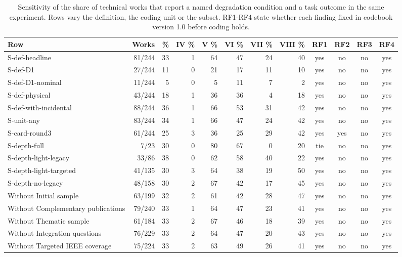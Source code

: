 \begin{table}[!t]
\centering
\caption{Sensitivity of the share of technical works that report a named degradation condition and a task outcome in the same experiment. Rows vary the definition, the coding unit or the subset. RF1-RF4 state whether each finding fixed in codebook version 1.0 before coding holds.}
\label{tab:sensitivity}
\surveytableformat
\setlength{\tabcolsep}{2.6pt}
\begin{tabularx}{\linewidth}{@{}Yrrrrrrrcccc@{}}
\toprule
\textbf{Row} & \textbf{Works} & \textbf{\%} & \textbf{IV \%} & \textbf{V \%} & \textbf{VI \%} & \textbf{VII \%} & \textbf{VIII \%} & \textbf{RF1} & \textbf{RF2} & \textbf{RF3} & \textbf{RF4} \\
\midrule
S-def-headline & 81/244 & 33 & 1 & 64 & 47 & 24 & 40 & yes & no & no & yes \\
S-def-D1 & 27/244 & 11 & 0 & 21 & 17 & 11 & 10 & yes & no & no & yes \\
S-def-D1-nominal & 11/244 & 5 & 0 & 5 & 11 & 7 & 2 & yes & no & no & yes \\
S-def-physical & 43/244 & 18 & 1 & 36 & 36 & 4 & 18 & yes & no & no & yes \\
S-def-with-incidental & 88/244 & 36 & 1 & 66 & 53 & 31 & 42 & yes & no & no & yes \\
S-unit-any & 83/244 & 34 & 1 & 66 & 47 & 24 & 42 & yes & no & no & yes \\
S-card-round3 & 61/244 & 25 & 3 & 36 & 25 & 29 & 42 & yes & yes & no & yes \\
S-depth-full & 7/23 & 30 & 0 & 80 & 67 & 0 & 20 & tie & no & no & yes \\
S-depth-light-legacy & 33/86 & 38 & 0 & 62 & 58 & 40 & 22 & yes & no & no & yes \\
S-depth-light-targeted & 41/135 & 30 & 3 & 64 & 38 & 19 & 50 & yes & no & no & yes \\
S-depth-no-legacy & 48/158 & 30 & 2 & 67 & 42 & 17 & 45 & yes & no & no & yes \\
Without Initial sample & 63/199 & 32 & 2 & 61 & 42 & 28 & 47 & yes & no & no & yes \\
Without Complementary publications & 79/240 & 33 & 1 & 64 & 47 & 23 & 41 & yes & no & no & yes \\
Without Thematic sample & 61/184 & 33 & 2 & 67 & 46 & 18 & 39 & yes & no & no & yes \\
Without Integration questions & 76/229 & 33 & 2 & 64 & 47 & 20 & 43 & yes & no & no & yes \\
Without Targeted IEEE coverage & 75/224 & 33 & 2 & 63 & 49 & 26 & 41 & yes & no & no & yes \\

\end{tabularx}
\end{table}
